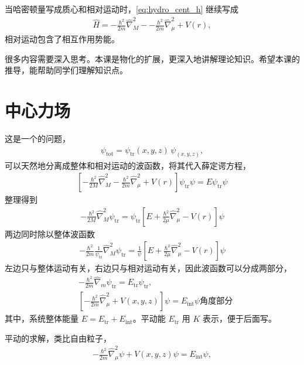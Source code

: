 当哈密顿量写成质心和相对运动时，\eqref{eq:hydro_cent_h} 继续写成
\begin{align}
    \hat H = -\frac{\hbar^2}{2m} \hat \nabla_M^2 -
    -\frac{\hbar^2}{2m} \hat \nabla _\mu ^2 + V(r),
\end{align}
相对运动包含了相互作用势能。

很多内容需要深入思考。本课是物化的扩展，更深入地讲解理论知识。希望本课的推导，能帮助同学们理解知识点。

\section{中心力场}
这是一个的问题，
\begin{align}
    \psi_{\mathrm{tot}} = \psi_{\mathrm{tr}}(x,y,z) \,\psi_(x,y,z),
\end{align}
可以天然地分离成整体和相对运动的波函数，将其代入薛定谔方程，
\begin{align}
    \left[
        -\frac{\hbar^2}{2M}\hat\nabla_M^2 - \frac{\hbar^2}{2m} \hat\nabla_\mu^2 + V(r) 
    \right] \psi_{\mathrm{tr}} \psi = E \psi_{\mathrm{tr}} \psi
\end{align}
整理得到
\begin{align}
    - \frac{\hbar^2}{2M}\hat\nabla_M^2 \psi_{\mathrm{tr}} = \psi_{\mathrm{tr}} \left[
        E + \frac{\hbar^2}{2\mu}\hat\nabla_\mu^2 - V(r)
    \right]\psi
\end{align}
两边同时除以整体波函数
\begin{align}
    -\frac{\hbar^2}{2m} \frac1{\psi_{\mathrm{tr}}} \hat\nabla_M^2 \psi_{\mathrm{tr}} = \frac1{\psi} \left[
        E + \frac{\hbar^2}{2\mu}\hat\nabla_\mu^2 - V(r)
    \right]\psi
\end{align}
左边只与整体运动有关，右边只与相对运动有关，因此波函数可以分成两部分，
\begin{align}
    & - \frac{\hbar^2}{2m} \hat \nabla_m \psi_{\mathrm{tr}} = E_\mathrm{tr} \psi_{\mathrm{tr}}, 
    \label{eq:hydro_Htr}
    \\
    & \left[-\frac{\hbar^2}{2m} \hat\nabla_\mu^2 + V(x,y,z)\right] \psi = E_\mathrm{int} \psi
    \label{eq:hydro_Hint}
    角度部分\end{align}
其中，系统整体能量 $E = E_{\mathrm{tr}} + E_{\mathrm{int}}$。平动能 $E_{\mathrm{tr}}$ 用 $K$ 表示，便于后面写。

平动的求解，类比自由粒子，
\begin{align}
    -\frac{\hbar^2}{2m} \hat\nabla_\mu^2 \psi + V(x,y,z) \psi = E_\mathrm{int} \psi, 
\end{align}

